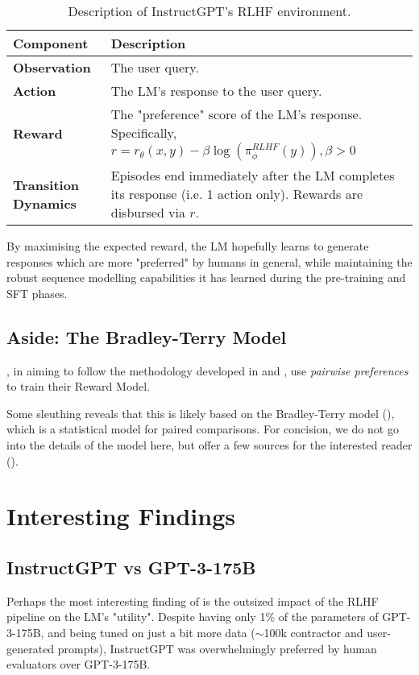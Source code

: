 \documentclass{article} %
\begin{document}
\begin{table}[h!]
\centering
\begin{tabular}{p{}p{}}
\toprule
\textbf{Component} & \textbf{Description} \\
\midrule
\textbf{Observation} & The user query. \\
\midrule
\textbf{Action} & The LM's response to the user query. \\
\midrule
\textbf{Reward} & The "preference" score of the LM's response. Specifically,
    $r = r_\theta(x, y) - \beta \log(\pi_{\phi}^{RLHF}(y)), \beta > 0$ \\
\midrule
\textbf{Transition Dynamics} & Episodes end immediately after the LM completes its response (i.e. 1 action only). 
    Rewards are disbursed via $r$. \\
\bottomrule
\end{tabular}
\caption{Description of InstructGPT's RLHF environment.}
\label{tab:rlhf_env}
\end{table}

By maximising the expected reward,
the LM hopefully learns to generate responses which are more "preferred" by humans in general,
while maintaining the robust sequence modelling capabilities it has learned
during the pre-training and SFT phases.

\subsection{Aside: The Bradley-Terry Model} \label{sec:bt-model}

\cite{InstructGPT-2022}, in aiming to follow the methodology developed in
\cite{Ziegler-et-al-2019} and \cite{Stiennon-et-al-2020},
use \textit{pairwise preferences} to train their Reward Model.

Some sleuthing reveals that this is likely based on the Bradley-Terry model
(\cite{Bradley-and-Terry-1952}), which is a statistical model for paired comparisons.
For concision, we do not go into the details of the model here, but
offer a few sources for the interested reader 
(\cite{Bradley-and-Terry-1952, Stiennon-et-al-2020, Fujii-2024}).

\section{Interesting Findings}

\subsection{InstructGPT vs GPT-3-175B}
Perhaps the most interesting finding of \cite{InstructGPT-2022} is
the outsized impact of the RLHF pipeline on the LM's "utility".
Despite having only 1\% of the parameters of GPT-3-175B,
and being tuned on just a bit more data ($\sim$100k contractor and user-generated prompts),
InstructGPT was overwhelmingly preferred by human evaluators over GPT-3-175B.
\end{document}
